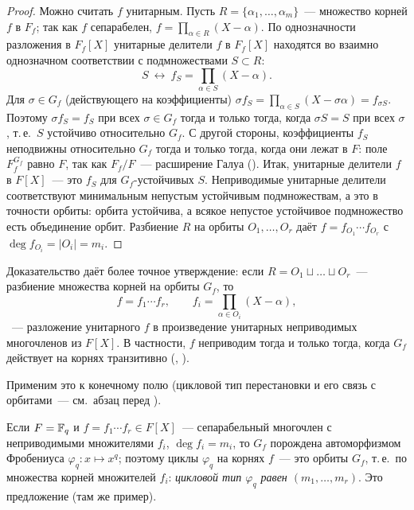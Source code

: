 \begin{proof}
Можно считать $f$ унитарным. Пусть $R=\{\alpha_1,\dots,\alpha_m\}$~--- множество корней $f$ в $F_f$; так как $f$ сепарабелен,
$f=\prod_{\alpha\in R}(X-\alpha)$. По однозначности разложения в $F_f[X]$ унитарные делители $f$ в $F_f[X]$ находятся во
взаимно однозначном соответствии с подмножествами $S\subset R$:
\[
S\ \longleftrightarrow\ f_S=\prod_{\alpha\in S}(X-\alpha).
\]
Для $\sigma\in G_f$ (действующего на коэффициенты) $\sigma f_S=\prod_{\alpha\in S}(X-\sigma\alpha)=f_{\sigma S}$. Поэтому
$\sigma f_S=f_S$ при всех $\sigma\in G_f$ тогда и только тогда, когда $\sigma S=S$ при всех $\sigma$, т.\,е.\ $S$
устойчиво относительно $G_f$. С другой стороны, коэффициенты $f_S$ неподвижны относительно $G_f$ тогда и только тогда,
когда они лежат в $F$: поле $F_f^{G_f}$ равно $F$, так как $F_f/F$~--- расширение Галуа (). Итак, унитарные
делители $f$ в $F[X]$~--- это $f_S$ для $G_f$-устойчивых $S$. Неприводимые унитарные делители соответствуют минимальным
непустым устойчивым подмножествам, а это в точности орбиты: орбита устойчива, а всякое непустое устойчивое
подмножество есть объединение орбит. Разбиение $R$ на орбиты $O_1,\dots,O_r$ даёт $f=f_{O_1}\cdots f_{O_r}$ с
$\deg f_{O_i}=|O_i|=m_i$.
\end{proof}

\begin{remark}[4.27]
Доказательство даёт более точное утверждение: если $R=O_1\sqcup\dots\sqcup O_r$~--- разбиение множества корней на орбиты
$G_f$, то
\[
f=f_1\cdots f_r,\qquad f_i=\prod_{\alpha\in O_i}(X-\alpha),
\]
~--- разложение унитарного $f$ в произведение унитарных неприводимых многочленов из $F[X]$. В частности, $f$ неприводим
тогда и только тогда, когда $G_f$ действует на корнях транзитивно (, ).
\end{remark}

Применим это к конечному полю (цикловой тип перестановки и его связь с орбитами~--- см.\ абзац перед ).

\begin{remark}[4.27a]
Если $F=\mathbb F_q$ и $f=f_1\cdots f_r\in F[X]$~--- сепарабельный многочлен с неприводимыми множителями $f_i$, $\deg f_i=m_i$,
то $G_f$ порождена автоморфизмом Фробениуса $\varphi_q\colon x\mapsto x^q$; поэтому циклы $\varphi_q$ на корнях $f$~---
это орбиты $G_f$, т.\,е.\ по  множества корней множителей $f_i$: \emph{цикловой тип $\varphi_q$ равен
$(m_1,\dots,m_r)$}. Это предложение  (там же пример).
\end{remark}

